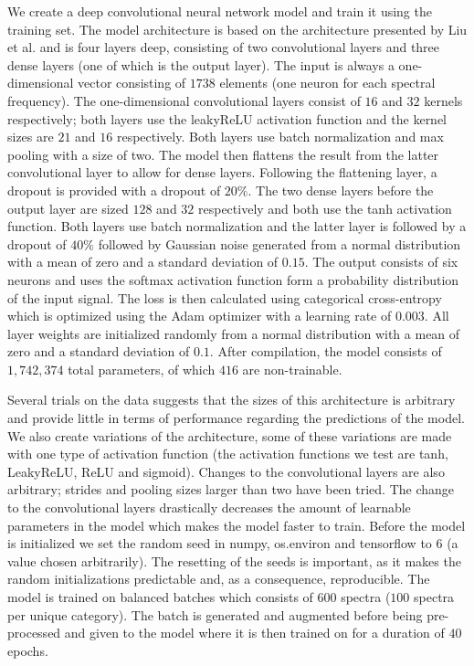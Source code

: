 We create a deep convolutional neural network model and train it using the training set. The model architecture is based on the architecture presented by Liu et al. \cite{liu2017deep} and is four layers deep, consisting of two convolutional layers and three dense layers (one of which is the output layer). The input is always a one-dimensional vector consisting of $1738$ elements (one neuron for each spectral frequency). The one-dimensional convolutional layers consist of $16$ and $32$ kernels respectively; both layers use the leakyReLU activation function and the kernel sizes are $21$ and $16$ respectively. Both layers use batch normalization and max pooling with a size of two. The model then flattens the result from the latter convolutional layer to allow for dense layers. Following the flattening layer, a dropout is provided with a dropout of $20\%$. The two dense layers before the output layer are sized $128$ and $32$ respectively and both use the tanh activation function. Both layers use batch normalization and the latter layer is followed by a dropout of $40\%$ followed by Gaussian noise generated from a normal distribution with a mean of zero and a standard deviation of $0.15$. The output consists of six neurons and uses the softmax activation function form a probability distribution of the input signal. The loss is then calculated using categorical cross-entropy which is optimized using the Adam optimizer with a learning rate of $0.003$. All layer weights are initialized randomly from a normal distribution with a mean of zero and a standard deviation of $0.1$. After compilation, the model consists of $1,742,374$ total parameters, of which $416$ are non-trainable.

Several trials on the data suggests that the sizes of this architecture is arbitrary and provide little in terms of performance regarding the predictions of the model. We also create variations of the architecture, some of these variations are made with one type of activation function (the activation functions we test are tanh, LeakyReLU, ReLU and sigmoid). Changes to the convolutional layers are also arbitrary; strides and pooling sizes larger than two have been tried. The change to the convolutional layers drastically decreases the amount of learnable parameters in the model which makes the model faster to train. Before the model is initialized we set the random seed in numpy, os.environ and tensorflow to 6 (a value chosen arbitrarily). The resetting of the seeds is important, as it makes the random initializations predictable and, as a consequence, reproducible. The model is trained on balanced batches which consists of $600$ spectra ($100$ spectra per unique category). The batch is generated and augmented before being pre-processed and given to the model where it is then trained on for a duration of $40$ epochs.

